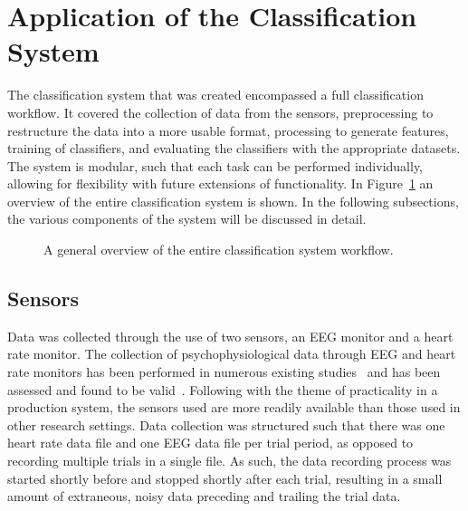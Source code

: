 \documentclass[11pt]{article}
\begin{document}
\section{Application of the Classification System}
The classification system that was created encompassed a full classification workflow. It covered the collection of data from the sensors, preprocessing to restructure the data into a more usable format, processing to generate features, training of classifiers, and evaluating the classifiers with the appropriate datasets. The system is modular, such that each task can be performed individually, allowing for flexibility with future extensions of functionality. 
In Figure~\ref{fig:system-overview} an overview of the entire classification system is shown. In the following subsections, the various components of the system will be discussed in detail. 
\begin{figure}
\centering
{}
\caption[General Overview of Complete Classification System Workflow]{A general overview of the entire classification system workflow.}
\label{fig:system-overview}
\end{figure} 

	\subsection{Sensors}
	Data was collected through the use of two sensors, an EEG monitor and a heart rate monitor. The collection of psychophysiological data through EEG and heart rate monitors has been performed in numerous existing studies~\cite{Wilson, Yang, Wang_Z} and has been assessed and found to be valid~\cite{Sweller}. Following with the theme of practicality in a production system, the sensors used are more readily available than those used in other research settings. Data collection was structured such that there was one heart rate data file and one EEG data file per trial period, as opposed to recording multiple trials in a single file. As such, the data recording process was started shortly before and stopped shortly after each trial, resulting in a small amount of extraneous, noisy data preceding and trailing the trial data.
		
\end{document}
